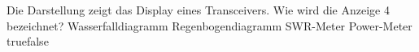    {Die Darstellung zeigt das Display eines Transceivers. Wie wird die Anzeige 4 bezeichnet?}
    {Wasserfalldiagramm}
    {Regenbogendiagramm}
    {SWR-Meter}
    {Power-Meter}
    {true}{false}